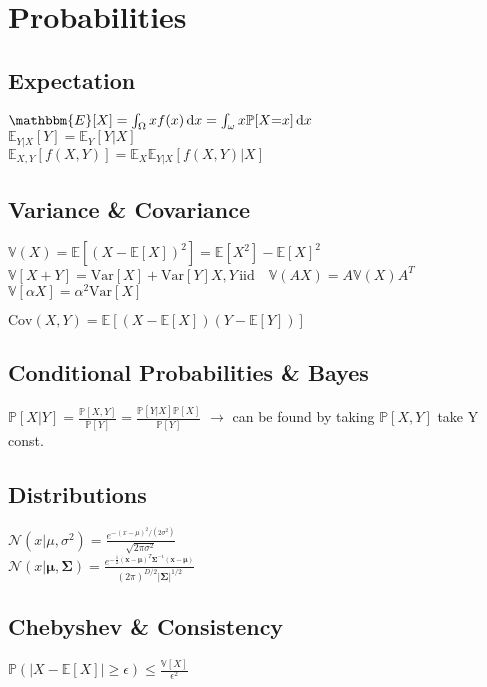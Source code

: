 \section*{Probabilities}
\subsection*{Expectation}
$\mathbbm{E}[X]=\int_{\Omega}xf(x)\di x=\int_{\omega}x\mathbb{P}[X{=}x]\di x$ \\
$\mathbb{E}_{Y|X}[Y]=\mathbb{E}_{Y}[Y|X]$\\
$\mathbb{E}_{X,Y}[f(X,Y)]=\mathbb{E}_{X}\mathbb{E}_{Y|X}[f(X,Y)|X]$

\subsection*{Variance \& Covariance}
$\mathbb{V}(X){=}\mathbb{E}[(X{-}\mathbb{E}[X])^2]{=}\mathbb{E}[X^2]{-}\mathbb{E}[X]^2$\\
$\mathbb{V}[X+Y]{=}\mathrm{Var}[X]+\mathrm{Var}[Y] X,Y \,\text{iid} \quad
\mathbb{V}(AX) = A \mathbb{V}(X) A^T$ 
$\mathbb{V}[\alpha X]=\alpha^2\mathrm{Var}[X]$

$\mathrm{Cov}(X,Y)=\mathbb{E}[(X-\mathbb{E}[X])(Y-\mathbb{E}[Y])]$

\subsection*{Conditional Probabilities \& Bayes}
$\mathbb{P}[X|Y]=\frac{\mathbb{P}[X,Y]}{\mathbb{P}[Y]}=\frac{\mathbb{P}[Y|X]\mathbb{P}[X]}{\mathbb{P}[Y]}$
$\rightarrow$ can be found by taking $\mathbb{P}[X,Y]$ take Y const.

\subsection*{Distributions}
$\mathcal{N}(x|\mu, \sigma^2)=\frac{e^{-(x-\mu)^2/(2\sigma^2)}}{\sqrt{2\pi\sigma^2}}$\\
$\mathcal{N}(x|\bm{\mu}, \bm{\Sigma})= \frac{e^{-\frac{1}{2}(\mathbf{x}-\bm{\mu})^T\bm{\Sigma}^{-1}(\mathbf{x}-\bm{\mu})}}{(2\pi)^{D/2}|\bm{\Sigma}|^{1/2}} $\\
\subsection*{Chebyshev \& Consistency}
$\mathbb{P}(|X-\mathbb{E}[X]|\geq \epsilon)\leq \frac{\mathbb{V}[X]}{\epsilon^2}$\\
